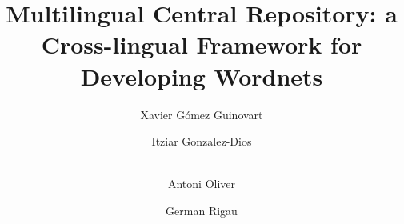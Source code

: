 \documentclass[runningheads]{llncs}
\begin{document}
%
\title{Multilingual Central Repository: a Cross-lingual Framework for Developing Wordnets}
%
%
\author{Xavier Gómez Guinovart \and
Itziar Gonzalez-Dios \and \\
Antoni Oliver\and
German Rigau}




%
%
\end{document}
